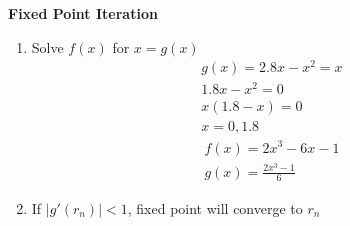 \documentclass[10pt]{article}
\begin{document}
\begin{multicols}{2}
\begin{minipage}{\columnwidth}
\begin{flushright}
            \textbf{Fixed Point Iteration}
            \begin{enumerate}
                \item Solve \(f(x)\) for \(x = g(x)\) \\
                      \begin{align*}
                          g(x) = 2.8x - x^2 = x \\
                          1.8x -x^2 = 0         \\
                          x(1.8 - x) = 0        \\
                          x = 0, 1.8
                      \end{align*}
                      \begin{align*}
                          f(x) = 2x^3 - 6x - 1 \\
                          g(x) = \frac{2x^3-1}{6}
                      \end{align*}
                \item If \(|g'(r_n)| < 1\), fixed point will converge to \(r_n\)
            \end{enumerate}
        \end{flushright}
    \end{minipage}
\end{multicols}
\end{document}
